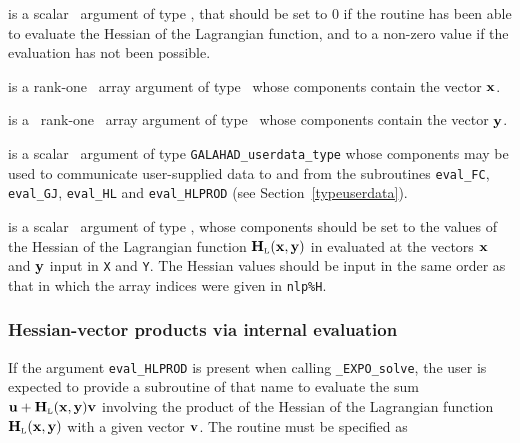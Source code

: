 \documentclass{galahad}
\newcommand{\packagename}{EXPO}
\newcommand{\fullpackagename}{\libraryname\_\packagename}
\newcommand{\solver}{{\tt \fullpackagename\_solve}}
\newcommand{\bmHL}{\bmH\sub{L}}
\begin{document}
\begin{description}
 is a scalar \intentout\ argument of type \integer,
that should be set to 0 if the routine has been able to evaluate
the Hessian of the Lagrangian function,
and to a non-zero value if the evaluation has not been possible.

 is a rank-one \intentin\ array argument of type \realdp\
whose components contain the vector ${\mathbf{x}}$.

 is a \ rank-one \intentin\ array argument of type
\realdp\ whose components contain the vector ${\mathbf{y}}$.

 is a scalar \intentinout\ argument of type
{\tt GALAHAD\_userdata\_type} whose components may be used
to communicate user-supplied data to and from the
subroutines {\tt eval\_FC}, {\tt eval\_GJ},
{\tt eval\_HL} and {\tt eval\_HLPROD}
(see Section~\ref{typeuserdata}).

 is a scalar \intentout\ argument of type \realdp,
whose components should be set to the values of the Hessian
of the Lagrangian function $\bmHL(\bmx,\bmy)$ in 
evaluated at the vectors ${\mathbf{x}}$ and ${\mathbf{y}}$  input in {\tt X} and {\tt Y}. 
The Hessian values should be input in the same order as that in which 
the array indices were given in {\tt nlp\%H}.


\end{description}


\subsubsection{Hessian-vector products via internal evaluation\label{hvfv}}

If the argument {\tt eval\_HLPROD} is present when calling \solver, the
user is expected to provide a subroutine of that name to evaluate the
sum $\bmu + \bmHL(\bmx,\bmy) \bmv$ involving the
product of the Hessian of the Lagrangian function $\bmHL(\bmx,\bmy)$
with a given vector ${\mathbf{v}}$. The routine must be specified as
\end{document}
